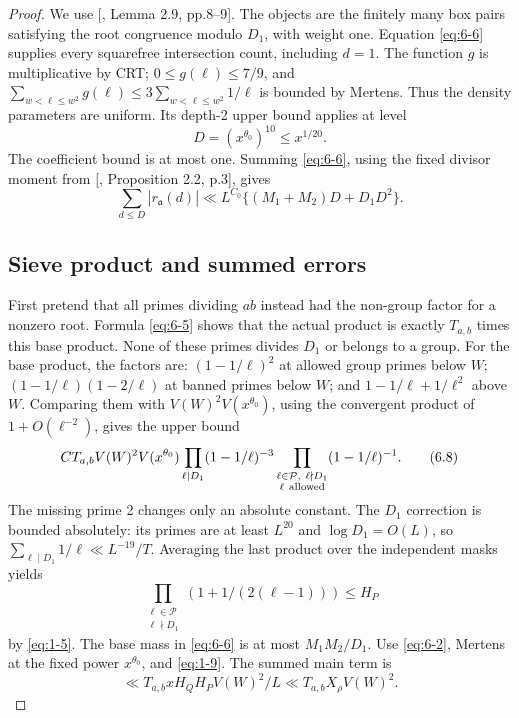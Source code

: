 \documentclass[11pt]{article}
\theoremstyle{definition}
\theoremstyle{definition}
\begin{document}
\begin{proof}
We use [, Lemma 2.9, pp.8--9]. The objects are the finitely many box pairs satisfying the root congruence modulo \(D_1\), with weight one. Equation \eqref{eq:6-6} supplies every squarefree intersection count, including \(d=1\). The function \(g\) is multiplicative by CRT; \(0\le g(\ell)\le7/9\), and \(\sum_{w<\ell\le w^2}g(\ell)\le3\sum_{w<\ell\le w^2}1/\ell\) is bounded by Mertens. Thus the density parameters are uniform. Its depth-2 upper bound applies at level
\begin{equation*}
D=(x^{\theta_0})^{10}\le x^{1/20}.
\end{equation*}
The coefficient bound is at most one. Summing \eqref{eq:6-6}, using the fixed divisor moment from [, Proposition 2.2, p.3], gives
\begin{equation}
\sum_{d\le D}|r_{\mathfrak a}(d)|
 \ll L^{C_0}\{(M_1+M_2)D+D_1D^2\}.                    \tag{6.7}\label{eq:6-7}
\end{equation}

\subsection{Sieve product and summed errors}\label{sec:s6.3}

First pretend that all primes dividing \(ab\) instead had the non-group factor for a nonzero root. Formula \eqref{eq:6-5} shows that the actual product is exactly \(T_{a,b}\) times this base product. None of these primes divides \(D_1\) or belongs to a group. For the base product, the factors are:
\((1-1/\ell)^2\) at allowed group primes below \(W\);
\((1-1/\ell)(1-2/\ell)\) at banned primes below \(W\);
and \(1-1/\ell+1/\ell^2\) above \(W\).
Comparing them with \(V(W)^2V(x^{\theta_0})\), using the convergent product of \(1+O(\ell^{-2})\), gives the upper bound
\begin{equation}
C T_{a,b}V(W)^2V(x^{\theta_0})
 \prod_{\ell\mid D_1}(1-1/\ell)^{-3}
 \prod_{\substack{\ell\in\mathcal P,\ \ell\nmid D_1\\
                                      \ell\ {\rm allowed}}}
                            (1-1/\ell)^{-1}.            \tag{6.8}\label{eq:6-8}
\end{equation}
The missing prime 2 changes only an absolute constant. The \(D_1\) correction is bounded absolutely: its primes are at least \(L^{20}\) and \(\log D_1=O(L)\), so \(\sum_{\ell\mid D_1}1/\ell\ll L^{-19}/T\). Averaging the last product over the independent masks yields
\begin{equation*}
\prod_{\substack{\ell\in\mathcal P\\\ell\nmid D_1}}
       (1+1/(2(\ell-1)))\le H_P
\end{equation*}
by \eqref{eq:1-5}. The base mass in \eqref{eq:6-6} is at most \(M_1M_2/D_1\). Use \eqref{eq:6-2}, Mertens at the fixed power \(x^{\theta_0}\), and \eqref{eq:1-9}. The summed main term is
\begin{equation*}
\ll T_{a,b}xH_QH_P V(W)^2/L
 \ll T_{a,b}X_\rho V(W)^2.
\end{equation*}


\end{proof}
\end{document}
